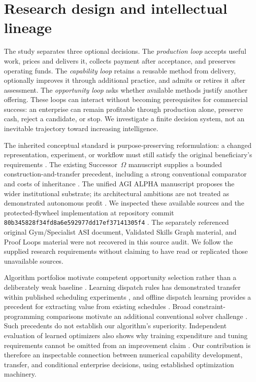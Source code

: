 
\section{Research design and intellectual lineage}
\label{sec:methods-design}

The study separates three optional decisions. The \emph{production loop} accepts useful work, prices and delivers it, collects payment after acceptance, and preserves operating funds. The \emph{capability loop} retains a reusable method from delivery, optionally improves it through additional practice, and admits or retires it after assessment. The \emph{opportunity loop} asks whether available methods justify another offering. These loops can interact without becoming prerequisites for commercial success: an enterprise can remain profitable through production alone, preserve cash, reject a candidate, or stop. We investigate a finite decision system, not an inevitable trajectory toward increasing intelligence.

The inherited conceptual standard is purpose-preserving reformulation: a changed representation, experiment, or workflow must still satisfy the original beneficiary's requirements \cite{boucher2026transformational}. The existing Successor~$\Omega$ manuscript supplies a bounded construction-and-transfer precedent, including a strong conventional comparator and costs of inheritance \cite{boucher2026successor}. The unified AGI ALPHA manuscript proposes the wider institutional substrate; its architectural ambitions are not treated as demonstrated autonomous profit \cite{boucher2026unified}. We inspected these available sources and the protected-flywheel implementation at repository commit \texttt{80b345828f34fd8a6e592977dd17ef37141305f4} \cite{montrealai2026runtime}. The separately referenced original Gym/Specialist ASI document, Validated Skills Graph material, and Proof Loops material were not recovered in this source audit. We follow the supplied research requirements without claiming to have read or replicated those unavailable sources.

Algorithm portfolios motivate competent opportunity selection rather than a deliberately weak baseline \cite{xu2008satzilla}. Learning dispatch rules has demonstrated transfer within published scheduling experiments \cite{zhang2020dispatch}, and offline dispatch learning provides a precedent for extracting value from existing schedules \cite{remmerden2025offline}. Broad constraint-programming comparisons motivate an additional conventional solver challenge \cite{lan2025pyjobshop}. Such precedents do not establish our algorithm's superiority. Independent evaluation of learned optimizers also shows why training expenditure and tuning requirements cannot be omitted from an improvement claim \cite{rezk2023velo}. Our contribution is therefore an inspectable connection between numerical capability development, transfer, and conditional enterprise decisions, using established optimization machinery.

